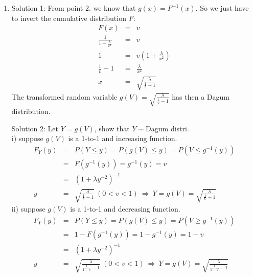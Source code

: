 \documentclass[12pt,thmsa]{article}
\begin{document}
\begin{enumerate}
\begin{enumerate}
  \item Solution 1: From point 2. we know that $g(x)=F^{-1}(x)$. So we just have to invert the cumulative distribution $F$:
  \begin{eqnarray*}
  F(x) &=&  v  \\
   \frac{1}{1+\frac{\lambda}{x^2}} &=& v \\
   1 &=& v \left( 1+\frac{\lambda}{x^2}\right)  \\
  \frac{1}{v} -1 &=& \frac{\lambda}{x^2}   \\
  x &=& \sqrt{\frac{\lambda}{\frac{1}{v} -1}}
  \end{eqnarray*}
The transformed random variable $g(V)=\sqrt{\frac{\lambda}{\frac{1}{V} -1}} $ has then a Dagum distribution.

\newpage
Solution 2: Let $Y=g(V)$, show that $Y \sim $Dagum distri. \\
  i) suppose $g(V)$ is a 1-to-1 and increasing function.\\
 \begin{eqnarray*}
  F_Y(y)&=&P(Y \leq y) =P(g(V) \leq y) = P(V \leq g^{-1}(y))\\
&=& F(g^{-1}(y))=g^{-1}(y)=v\\
&=& (1+\lambda y^{-2})^{-1}\\
y &=& \sqrt{\frac{\lambda}{\frac{1}{v} -1}} \ (0<v<1) \ \Rightarrow  \ Y =g(V)= \sqrt{\frac{\lambda}{\frac{1}{V} -1}}
\end{eqnarray*}
 ii) suppose $g(V)$ is a 1-to-1 and decreasing function.\\
 \begin{eqnarray*}
  F_Y(y)&=&P(Y \leq y) =P(g(V) \leq y) = P(V \geq g^{-1}(y))\\
&=& 1-F(g^{-1}(y))=1-g^{-1}(y)=1-v\\
&=& (1+\lambda y^{-2})^{-1}\\
y &=& \sqrt{\frac{\lambda}{\frac{1}{1-v} -1}} \ (0<v<1) \ \Rightarrow  \ Y =g(V)= \sqrt{\frac{\lambda}{\frac{1}{1-V} -1}}
\end{eqnarray*}

\end{enumerate}

\end{enumerate}
\end{document}
